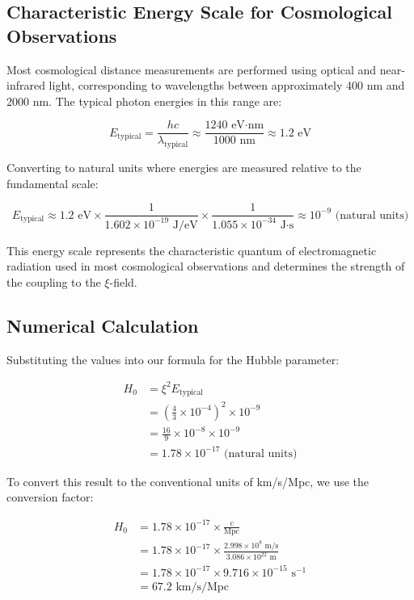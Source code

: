 \documentclass[12pt,a4paper]{article}
\begin{document}
	\subsection{Characteristic Energy Scale for Cosmological Observations}
	
	Most cosmological distance measurements are performed using optical and near-infrared light, corresponding to wavelengths between approximately 400 nm and 2000 nm. The typical photon energies in this range are:
	
	\begin{equation}
		E_{\text{typical}} = \frac{hc}{\lambda_{\text{typical}}} \approx \frac{1240 \text{ eV·nm}}{1000 \text{ nm}} \approx 1.2 \text{ eV}
	\end{equation}
	
	Converting to natural units where energies are measured relative to the fundamental scale:
	
	\begin{equation}
		E_{\text{typical}} \approx 1.2 \text{ eV} \times \frac{1}{1.602 \times 10^{-19} \text{ J/eV}} \times \frac{1}{1.055 \times 10^{-34} \text{ J·s}} \approx 10^{-9} \text{ (natural units)}
	\end{equation}
	
	This energy scale represents the characteristic quantum of electromagnetic radiation used in most cosmological observations and determines the strength of the coupling to the $\xi$-field.
	
	\subsection{Numerical Calculation}
	
	Substituting the values into our formula for the Hubble parameter:
	
	\begin{align}
		H_0 &= \xi^2 E_{\text{typical}} \\
		&= \left(\frac{4}{3} \times 10^{-4}\right)^2 \times 10^{-9} \\
		&= \frac{16}{9} \times 10^{-8} \times 10^{-9} \\
		&= 1.78 \times 10^{-17} \text{ (natural units)}
	\end{align}
	
	To convert this result to the conventional units of km/s/Mpc, we use the conversion factor:
	
	\begin{align}
		H_0 &= 1.78 \times 10^{-17} \times \frac{c}{\text{Mpc}} \\
		&= 1.78 \times 10^{-17} \times \frac{2.998 \times 10^8 \text{ m/s}}{3.086 \times 10^{22} \text{ m}} \\
		&= 1.78 \times 10^{-17} \times 9.716 \times 10^{-15} \text{ s}^{-1} \\
		&= 67.2 \text{ km/s/Mpc}
	\end{align}
	
\end{document}
